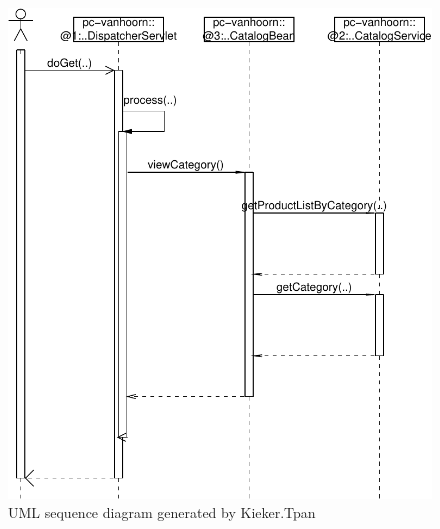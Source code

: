 \begin{figure}\centering

\includegraphics[width=0.8\columnwidth]{figures/20090710-163529-jpetstore-250Threads-400sDuration-200sRampup-sequenceDiagram-19503--20100428-crop}%

\caption{UML sequence diagram generated by Kieker.Tpan}
\label{fig:vis:jpetSeqDiagr}
\end{figure}

